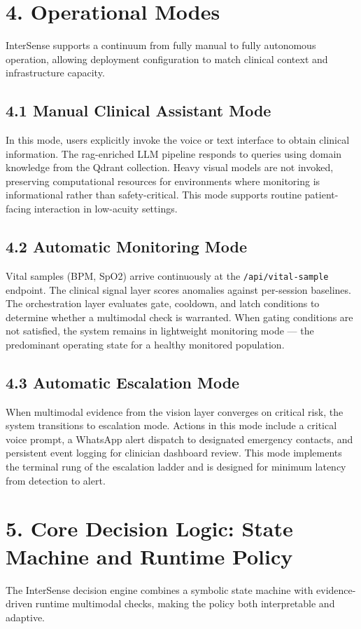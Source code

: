 \documentclass[11pt,a4paper]{article}
\begin{document}
\section{4. Operational Modes}
InterSense supports a continuum from fully manual to fully autonomous operation, allowing deployment configuration to match clinical context and infrastructure capacity.

\subsection{4.1 Manual Clinical Assistant Mode}
In this mode, users explicitly invoke the voice or text interface to obtain clinical information. The \gls{rag}-enriched LLM pipeline responds to queries using domain knowledge from the Qdrant collection. Heavy visual models are not invoked, preserving computational resources for environments where monitoring is informational rather than safety-critical. This mode supports routine patient-facing interaction in low-acuity settings.

\subsection{4.2 Automatic Monitoring Mode}
Vital samples (BPM, SpO2) arrive continuously at the \texttt{/api/vital-sample} endpoint. The clinical signal layer scores anomalies against per-session baselines. The orchestration layer evaluates gate, cooldown, and latch conditions to determine whether a multimodal check is warranted. When gating conditions are not satisfied, the system remains in lightweight monitoring mode — the predominant operating state for a healthy monitored population.

\subsection{4.3 Automatic Escalation Mode}
When multimodal evidence from the vision layer converges on critical risk, the system transitions to escalation mode. Actions in this mode include a critical voice prompt, a WhatsApp alert dispatch to designated emergency contacts, and persistent event logging for clinician dashboard review. This mode implements the terminal rung of the escalation ladder and is designed for minimum latency from detection to alert.

\section{5. Core Decision Logic: State Machine and Runtime Policy}
The InterSense decision engine combines a symbolic state machine with evidence-driven runtime multimodal checks, making the policy both interpretable and adaptive.
\end{document}
